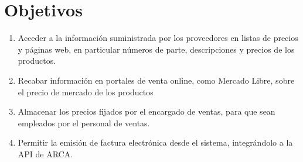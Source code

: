 \section{Objetivos}

\begin{enumerate}
	\item Acceder a la información suministrada por los proveedores en listas de precios y páginas web, 
	en particular números de parte, descripciones y precios de los productos.
	\item Recabar información en portales de venta online, como Mercado Libre, sobre el precio de mercado de los productos 
	\item Almacenar los precios fijados por el encargado de ventas, para que sean empleados por el personal de ventas.
	\item Permitir la emisión de factura electrónica desde el sistema, integrándolo a la API de ARCA.
\end{enumerate}
